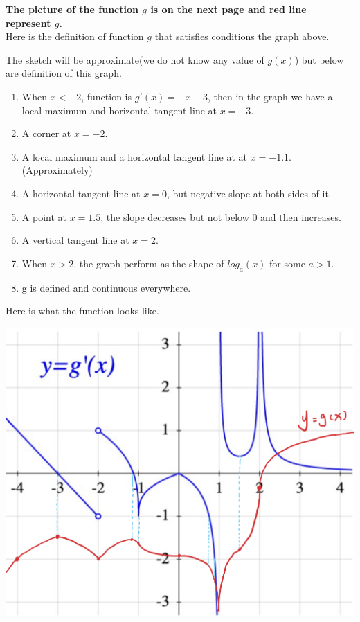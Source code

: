 \documentclass[12pt]{exam}
\newcommand{\vv}{\vspace{.4cm}}
\begin{document}
\textbf{The picture of the function $g$ is on the next page and red line represent $g$.}\\
Here is the definition of function $g$ that satisfies conditions the graph above.\\

\vv

The sketch will be approximate(we do not know any value of $g(x)$) but below are definition of this graph.

\begin{enumerate}
	\item When $x<-2$, function is $g'(x)=-x-3$, then in the graph we have a local maximum and horizontal tangent line at $x=-3$.
	\item A corner at $x=-2$.
	\item A local maximum and a horizontal tangent line at at $x=-1.1$.(Approximately)
	\item A horizontal tangent line at $x=0$, but negative slope at both sides of it.
	\item A point at $x=1.5$, the slope decreases but not below 0 and then increases.
	\item A vertical tangent line at $x=2$.
	\item When $x>2$, the graph perform as the shape of $log_a(x)$ for some $a>1$.
	\item g is defined and continuous everywhere.
\end{enumerate}


\newpage
Here is what the function looks like.
\vv

\includegraphics[scale = 0.5]{function graph.png}
\end{document}
